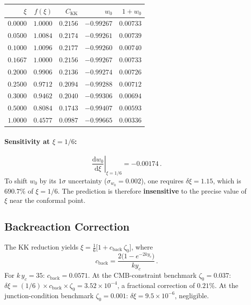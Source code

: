 \begin{center}
\begin{tabular}{r r r r r}
\hline
$\xi$ & $f(\xi)$ & $C_{\mathrm{KK}}$ & $w_0$ & $1 + w_0$ \\
\hline
$0.0000$ & $1.0000$ & $0.2156$ & $-0.99267$ & $0.00733$ \\
$0.0500$ & $1.0084$ & $0.2174$ & $-0.99261$ & $0.00739$ \\
$0.1000$ & $1.0096$ & $0.2177$ & $-0.99260$ & $0.00740$ \\
$0.1667$ & $1.0000$ & $0.2156$ & $-0.99267$ & $0.00733$ \\
$0.2000$ & $0.9906$ & $0.2136$ & $-0.99274$ & $0.00726$ \\
$0.2500$ & $0.9712$ & $0.2094$ & $-0.99288$ & $0.00712$ \\
$0.3000$ & $0.9462$ & $0.2040$ & $-0.99306$ & $0.00694$ \\
$0.5000$ & $0.8084$ & $0.1743$ & $-0.99407$ & $0.00593$ \\
$1.0000$ & $0.4577$ & $0.0987$ & $-0.99665$ & $0.00336$ \\
\hline
\end{tabular}
\end{center}

\paragraph{Sensitivity at $\xi = 1/6$:}
\begin{equation}
  \left.\frac{\mathrm{d}w_0}{\mathrm{d}\xi}\right|_{\xi=1/6} = -0.00174\,.
\end{equation}
To shift $w_0$ by its $1\sigma$ uncertainty ($\sigma_{w_0} = 0.002$), one requires $\delta\xi = 1.15$, which is $690.7\%$ of $\xi = 1/6$. The prediction is therefore \textbf{insensitive} to the precise value of $\xi$ near the conformal point.

\subsection{Backreaction Correction}

The KK reduction yields $\xi = \frac{1}{6}\bigl[1 + c_{\mathrm{back}}\,\zeta_0\bigr]$, where
\begin{equation}
  c_{\mathrm{back}} = \frac{2\bigl(1 - e^{-2ky_c}\bigr)}{ky_c}\,.
\end{equation}
For $k\,y_c = 35$: $c_{\mathrm{back}} = 0.0571$. At the CMB-constraint benchmark $\zeta_0 = 0.037$: $\delta\xi = (1/6) \times c_{\mathrm{back}} \times \zeta_0 = 3.52 \times 10^{-4}$, a fractional correction of $0.21\%$. At the junction-condition benchmark $\zeta_0 = 0.001$: $\delta\xi = 9.5 \times 10^{-6}$, negligible.

